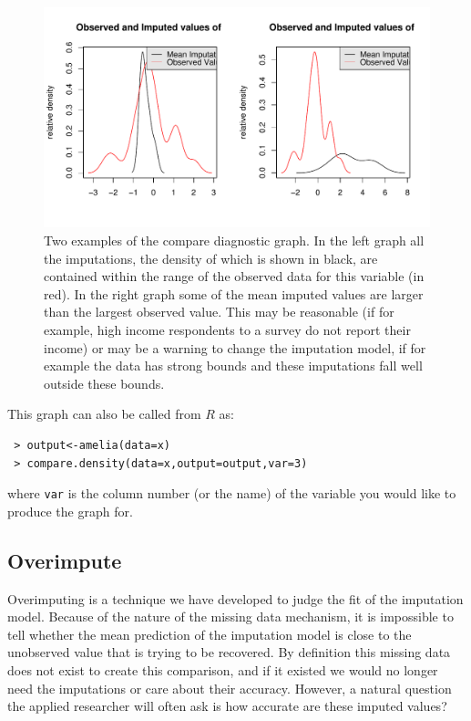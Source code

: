 \documentclass[12pt,titlepage]{article}
\begin{document}
\begin{figure}[htp!]\label{f:oi}
  \centering \includegraphics[scale=.8]{comp.pdf}
  \caption{ Two examples of the compare diagnostic graph.  In the left graph all the imputations, the density of which is shown in black, are contained within the range of the observed data for this variable (in red).  In the right graph some of the mean imputed values are larger than the largest observed value.  This may be reasonable (if for example, high income respondents to a survey do not report their income) or may be a warning to change the imputation model, if for example the data has strong bounds and these imputations fall well outside these bounds.}
\end{figure}


This graph can also be called from $R$ as:
\begin{verbatim}
 > output<-amelia(data=x) 
 > compare.density(data=x,output=output,var=3)
\end{verbatim}
where \texttt{var} is the column number (or the name) of the variable
you would like to produce the graph for.

\subsection{Overimpute}
\label{sec:overimpute}
Overimputing is a technique we have developed to judge the fit of the
imputation model.  Because of the nature of the missing data
mechanism, it is impossible to tell whether the mean prediction of the
imputation model is close to the unobserved value that is trying to be
recovered.  By definition this missing data does not exist to create
this comparison, and if it existed we would no longer need the
imputations or care about their accuracy.  However, a natural question
the applied researcher will often ask is how accurate are these
imputed values?
\end{document}
